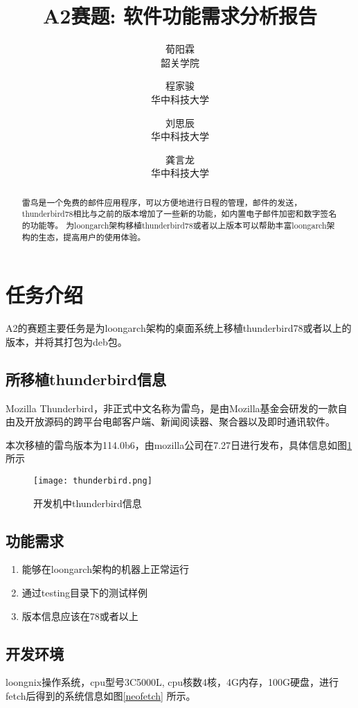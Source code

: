 \documentclass[lang=cn,a4paper,newtx]{elegantpaper}
\title{A2赛题: 软件功能需求分析报告}
\author{荀阳霖	\\ 韶关学院 \and 程家骏 \\ 华中科技大学 \and 刘思辰\\ 华中科技大学 \and 龚言龙 \\ 华中科技大学}
\institute{\href{https://elegantlatex.org/}{porter项目组}}
\date{\zhdate{2023/7/5}}
\begin{document}
\maketitle

\begin{abstract}
    雷鸟是一个免费的邮件应用程序，可以方便地进行日程的管理，邮件的发送，thunderbird78相比与之前的版本增加了一些新的功能，如内置电子邮件加密和数字签名的功能等。
为loongarch架构移植thunderbird78或者以上版本可以帮助丰富loongarch架构的生态，提高用户的使用体验。
\end{abstract}

\section{任务介绍}

A2的赛题主要任务是为loongarch架构的桌面系统上移植thunderbird78或者以上的版本，并将其打包为deb包。
\subsection{所移植thunderbird信息}
Mozilla Thunderbird，非正式中文名称为雷鸟，是由Mozilla基金会研发的一款自由及开放源码的跨平台电邮客户端、新闻阅读器、聚合器以及即时通讯软件。


本次移植的雷鸟版本为114.0b6，由mozilla公司在7.27日进行发布，具体信息如图\ref{thunderbird}所示
\begin{figure}[!htb]
    \centering
    \texttt{[image: thunderbird.png]}
    \caption{开发机中thunderbird信息}
    \label{thunderbird}
\end{figure}

\subsection{功能需求}
\begin{enumerate}
    \item 能够在loongarch架构的机器上正常运行
    \item 通过testing目录下的测试样例
    \item 版本信息应该在78或者以上
\end{enumerate}
\subsection{开发环境}

loongnix操作系统，cpu型号3C5000L, cpu核数4核，4G内存，100G硬盘，进行fetch后得到的系统信息如图\ref{neofetch} 所示。
\end{document}
